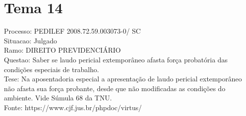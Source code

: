 \documentclass[12pt]{article}
\begin{document}
\section*{Tema 14}
Processo: PEDILEF 2008.72.59.003073-0/ SC\\
Situacao: Julgado\\
Ramo: DIREITO PREVIDENCIÁRIO\\
Questao: Saber se laudo pericial extemporâneo afasta força probatória das condições especiais de trabalho.\\
Tese: Na aposentadoria especial a apresentação de laudo pericial extemporâneo não afasta sua força probante, desde que não modificadas as condições do ambiente. Vide Súmula 68 da TNU.\\
Fonte: https://www.cjf.jus.br/phpdoc/virtus/
\end{document}
